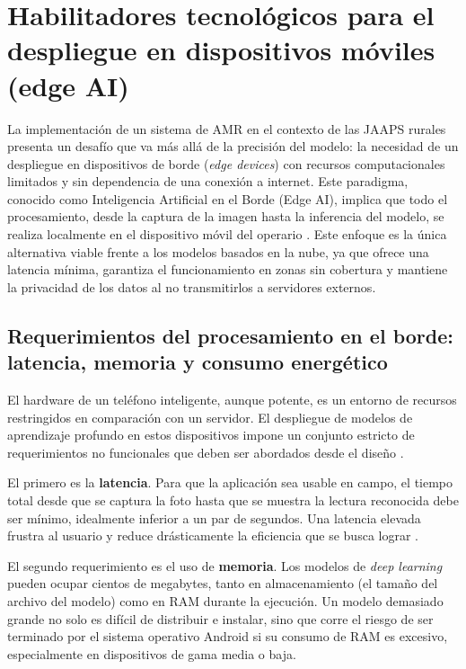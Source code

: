 \section{Habilitadores tecnológicos para el despliegue en dispositivos móviles (edge AI)}
\label{sec:mobile_deployment_enablers}

La implementación de un sistema de AMR en el contexto de las JAAPS rurales presenta un desafío que va más allá de la precisión del modelo: la necesidad de un despliegue en dispositivos de borde (\textit{edge devices}) con recursos computacionales limitados y sin dependencia de una conexión a internet. Este paradigma, conocido como Inteligencia Artificial en el Borde (Edge AI), implica que todo el procesamiento, desde la captura de la imagen hasta la inferencia del modelo, se realiza localmente en el dispositivo móvil del operario \parencite{Li2023EdgeAI}. Este enfoque es la única alternativa viable frente a los modelos basados en la nube, ya que ofrece una latencia mínima, garantiza el funcionamiento en zonas sin cobertura y mantiene la privacidad de los datos al no transmitirlos a servidores externos.

\subsection{Requerimientos del procesamiento en el borde: latencia, memoria y consumo energético}
\label{ssec:edge_requirements}

El hardware de un teléfono inteligente, aunque potente, es un entorno de recursos restringidos en comparación con un servidor. El despliegue de modelos de aprendizaje profundo en estos dispositivos impone un conjunto estricto de requerimientos no funcionales que deben ser abordados desde el diseño \parencite{Poddar2024Survey}.

El primero es la \textbf{latencia}. Para que la aplicación sea usable en campo, el tiempo total desde que se captura la foto hasta que se muestra la lectura reconocida debe ser mínimo, idealmente inferior a un par de segundos. Una latencia elevada frustra al usuario y reduce drásticamente la eficiencia que se busca lograr \parencite{Carvalho2023}.

El segundo requerimiento es el uso de \textbf{memoria}. Los modelos de \textit{deep learning} pueden ocupar cientos de megabytes, tanto en almacenamiento (el tamaño del archivo del modelo) como en RAM durante la ejecución. Un modelo demasiado grande no solo es difícil de distribuir e instalar, sino que corre el riesgo de ser terminado por el sistema operativo Android si su consumo de RAM es excesivo, especialmente en dispositivos de gama media o baja.

